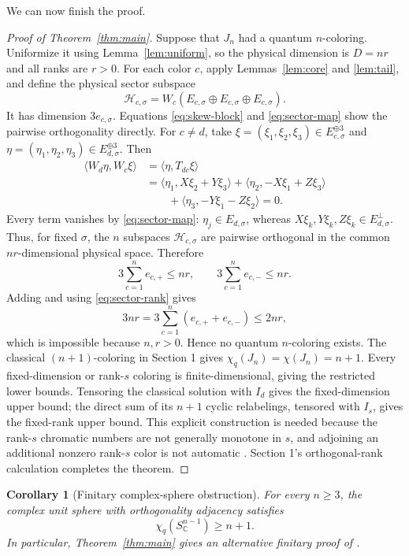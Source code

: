 \documentclass[11pt]{article}
\newtheorem{corollary}[theorem]{Corollary}
\newcommand{\C}{\mathbb C}
\begin{document}
We can now finish the proof.

\begin{proof}[Proof of Theorem~\ref{thm:main}]
Suppose that $J_n$ had a quantum $n$-coloring.  Uniformize it using
Lemma~\ref{lem:uniform}, so the physical dimension is $D=nr$ and all ranks
are $r>0$.  For each color $c$, apply Lemmas~\ref{lem:core} and
\ref{lem:tail}, and define the physical sector subspace
\[
       \mathcal H_{c,\sigma}
       =W_c(E_{c,\sigma}\oplus E_{c,\sigma}\oplus E_{c,\sigma}).
\]
It has dimension $3e_{c,\sigma}$.  Equations
\eqref{eq:skew-block} and \eqref{eq:sector-map} show the pairwise
orthogonality directly.  For $c\ne d$, take
$\xi=(\xi_1,\xi_2,\xi_3)\in E_{c,\sigma}^{\oplus3}$ and
$\eta=(\eta_1,\eta_2,\eta_3)\in E_{d,\sigma}^{\oplus3}$.  Then
\begin{align*}
 \bigl\langle W_d\eta,W_c\xi\bigr\rangle
 &=\bigl\langle\eta,T_{dc}\xi\bigr\rangle\\
 &=\bigl\langle\eta_1,X\xi_2+Y\xi_3\bigr\rangle
   +\bigl\langle\eta_2,-X\xi_1+Z\xi_3\bigr\rangle\\
 &\qquad
   +\bigl\langle\eta_3,-Y\xi_1-Z\xi_2\bigr\rangle=0.
\end{align*}
Every term vanishes by \eqref{eq:sector-map}: $\eta_j\in E_{d,\sigma}$,
whereas $X\xi_k,Y\xi_k,Z\xi_k\in E_{d,\sigma}^{\perp}$.  Thus, for fixed
$\sigma$, the $n$ subspaces $\mathcal H_{c,\sigma}$ are pairwise orthogonal
in the common $nr$-dimensional physical space.  Therefore
\[
       3\sum_{c=1}^n e_{c,+}\leq nr,
       \qquad
       3\sum_{c=1}^n e_{c,-}\leq nr.
\]
Adding and using \eqref{eq:sector-rank} gives
\[
        3nr=3\sum_{c=1}^n(e_{c,+}+e_{c,-})\leq2nr,
\]
which is impossible because $n,r>0$.  Hence no quantum $n$-coloring exists.
The classical $(n+1)$-coloring in Section 1 gives
$\chi_q(J_n)=\chi(J_n)=n+1$.  Every fixed-dimension or rank-$s$ coloring is
finite-dimensional, giving the restricted lower bounds.  Tensoring the
classical solution with $I_d$ gives the fixed-dimension upper bound; the
direct sum of its $n+1$ cyclic relabelings, tensored with $I_s$, gives the
fixed-rank upper bound.  This explicit construction is needed because the
rank-$s$ chromatic numbers are not generally monotone in $s$, and adjoining
an additional nonzero rank-$s$ color is not automatic
\cite[Section~2.4.2]{Lalonde2026}.  Section 1's orthogonal-rank calculation
completes the theorem.
\end{proof}

\begin{corollary}[Finitary complex-sphere obstruction]
For every $n\geq3$, the complex unit sphere with orthogonality adjacency
satisfies
\[
       \chi_q(S_{\C}^{n-1})\geq n+1.
\]
In particular, Theorem~\ref{thm:main} gives an alternative finitary proof of
\cite[Theorem~1.2]{Lalonde2026}.
\end{corollary}
\end{document}
